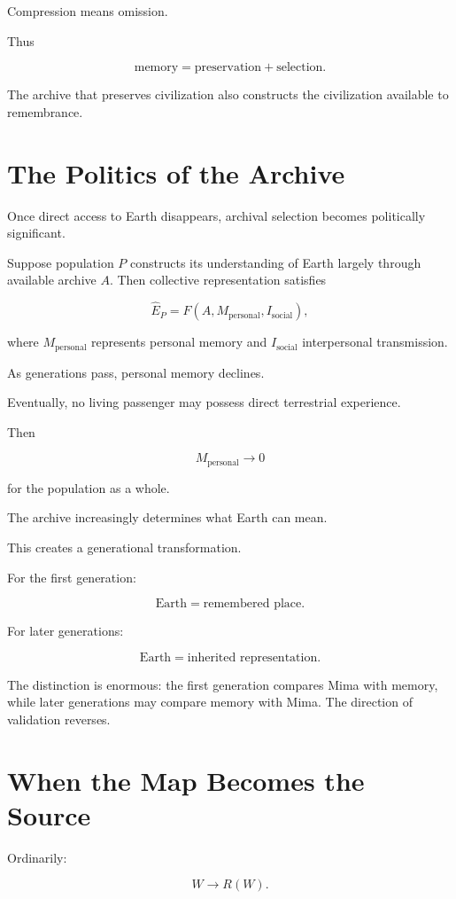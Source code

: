 \documentclass[11pt,oneside]{book}
\theoremstyle{definition}
\theoremstyle{remark}
\begin{document}
Compression means omission.

Thus

\[
\text{memory}
=
\text{preservation}
+
\text{selection}.
\]

The archive that preserves civilization also constructs the civilization available to remembrance.

\section{The Politics of the Archive}

Once direct access to Earth disappears, archival selection becomes politically significant.

Suppose population \(P\) constructs its understanding of Earth largely through available archive \(A\). Then collective representation satisfies

\[
\widehat E_P
=
F(A,M_{\mathrm{personal}},I_{\mathrm{social}}),
\]

where \(M_{\mathrm{personal}}\) represents personal memory and \(I_{\mathrm{social}}\) interpersonal transmission.

As generations pass, personal memory declines.

Eventually, no living passenger may possess direct terrestrial experience.

Then

\[
M_{\mathrm{personal}}\rightarrow0
\]

for the population as a whole.

The archive increasingly determines what Earth can mean.

This creates a generational transformation.

For the first generation:

\[
\text{Earth}=\text{remembered place}.
\]

For later generations:

\[
\text{Earth}=\text{inherited representation}.
\]

The distinction is enormous: the first generation compares Mima with memory, while later generations may compare memory with Mima. The direction of validation reverses.

\section{When the Map Becomes the Source}

Ordinarily:

\[
W\rightarrow R(W).
\]
\end{document}

